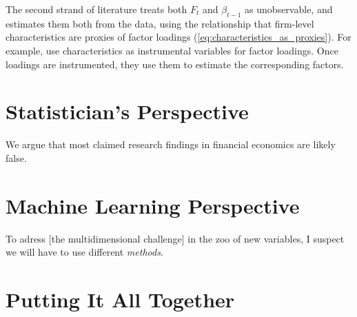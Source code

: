 		The second strand of literature treats both $F_t$ and $\beta_{t-1}$ as unobservable, and estimates them both from the data, using the  relationship that firm-level characteristics are proxies of factor loadings (\ref{eq:characteristics_as_proxies}). For example, \cite{kelly2019characteristics} use characteristics as instrumental variables for factor loadings. Once loadings are instrumented, they use them to estimate the corresponding factors.
	
	\section{Statistician's Perspective} 
		
		\epigraph{We argue that most claimed research findings in financial economics are likely false. }{\cite{harvey2016and}}
	
	\section{Machine Learning Perspective}
	
		\epigraph{To adress [the multidimensional challenge] in the zoo of new variables, I suspect we will have to use different \textit{methods}.}{\cite{cochrane2011presidential}}
	
		\cite{gu2020empirical} 
    
	\section{Putting It All Together}
	

	
	   
	
	   
	



